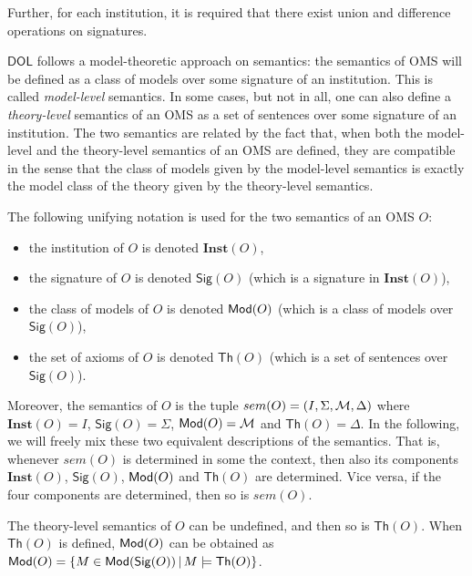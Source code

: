 \documentclass[10pt, a4paper]{isov2}
\newcommand{\Sig}{\mathsf{Sig}}
\renewcommand{\Th}{\mathsf{Th}}
\newcommand{\Inst}{\ensuremath{\mathbf{Inst}}}
\newcommand*{\DOL}{\ensuremath{\mathsf{DOL}}\xspace}
\begin{document}
Further,  for each institution, it is required that there exist union and difference operations on signatures.

\medskip

\DOL follows a model-theoretic approach on semantics: the semantics of OMS will be defined as a class of models 
over some signature of an institution. This is called \emph{model-level}  semantics. In some cases, but not in all, one can also define
a \emph{theory-level} semantics of an OMS as a set of sentences over some signature of an institution. The two semantics are 
related by the fact that, when both the model-level and the theory-level semantics of an OMS are defined, they are compatible in the 
sense that the class of models given by the model-level semantics is exactly the model class of the theory given by the
theory-level semantics. 

 The following unifying notation is used for the two semantics of an OMS $O$:\begin{itemize}
 \item the institution of $O$ is denoted $\Inst(O)$,
  \item the signature of $O$ is denoted $\Sig(O)$ (which is a signature in $\Inst(O)$),
  \item the class of models of $O$ is denoted $\mathsf{Mod}(O)$ (which is a class of models over $\Sig(O)$),
  \item the set of axioms of $O$ is denoted $\Th(O)$ (which is a set of sentences over $\Sig(O)$).
\end{itemize}
\noindent Moreover, the semantics of $O$ is the tuple $sem(O) = (I, \Sigma, {\cal M},\Delta)$
where $\Inst(O) = I$, $\Sig(O) = \Sigma$, $\mathsf{Mod}(O) = {\cal M}$ and $\Th(O) = \Delta$.
In the following, we will freely mix these two equivalent descriptions of the semantics. That is, whenever $sem(O)$ is determined in some the context, then also its components $\Inst(O)$, $\Sig(O)$, $\mathsf{Mod}(O)$ and $\Th(O)$ are determined. Vice versa, if the four components are determined, then so is $sem(O)$.

The theory-level semantics of $O$ can be undefined, and then so is $\Th(O)$. When $\Th(O)$ is defined, $\mathsf{Mod}(O)$ can be obtained as $\Mod(O)=\{M\in\Mod(\Sig(O)) \,|\, M\models\Th(O)\}$.
\end{document}
